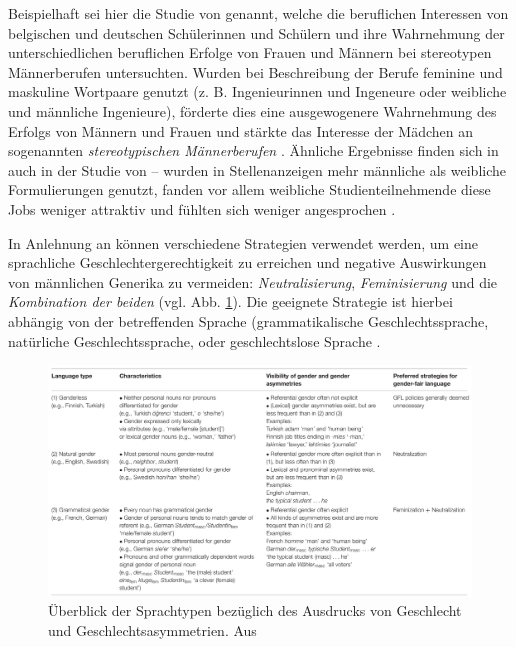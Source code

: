 \documentclass[12pt, 
    twoside=false, 
    bibliography=totoc, 
    numbers=endperiod, 
    headings=normal, 
    toc=chapterentrydotfill
    ]{scrbook}
\begin{document}
Beispielhaft sei hier die Studie von \textcite{vervecken_2013} genannt, welche die beruflichen Interessen von belgischen und deutschen Schülerinnen und Schülern und ihre Wahrnehmung der unterschiedlichen beruflichen Erfolge von Frauen und Männern bei stereotypen Männerberufen untersuchten. Wurden bei Beschreibung der Berufe feminine und maskuline Wortpaare genutzt (z. B. Ingenieurinnen und Ingeneure oder weibliche und männliche Ingenieure), förderte dies eine ausgewogenere Wahrnehmung des Erfolgs von Männern und Frauen und stärkte das Interesse der Mädchen an sogenannten \emph{stereotypischen Männerberufen} \parencite{vervecken_2013}. Ähnliche Ergebnisse finden sich in auch in der Studie von \textcite{gaucher_2011} -- wurden in Stellenanzeigen mehr männliche als weibliche Formulierungen genutzt, fanden vor allem weibliche Studienteilnehmende diese Jobs weniger attraktiv und fühlten sich weniger angesprochen \parencite[11]{gaucher_2011}.

In Anlehnung an \textcite{sczesny_2016} können verschiedene Strategien verwendet werden, um eine sprachliche Geschlechtergerechtigkeit zu erreichen und negative Auswirkungen von männlichen Generika zu vermeiden: \emph{Neutralisierung}, \emph{Feminisierung} und die \emph{Kombination der beiden} (vgl. Abb. \ref{fig:table_sprachtypen}). Die geeignete Strategie ist hierbei abhängig von der betreffenden Sprache (grammatikalische Geschlechtssprache, natürliche Geschlechtssprache, oder geschlechtslose Sprache \parencites[vgl.][]{bussmann_2003}[][3]{sczesny_2016}. 

\begin{figure}
    \centering
    \includegraphics[width=\textwidth]{images/sczesny_table.png}
    \caption[Überblick der Sprachtypen bezüglich des Ausdrucks von Geschlecht und Geschlechtsasymmetrien]{Überblick der Sprachtypen bezüglich des Ausdrucks von Geschlecht und Geschlechtsasymmetrien. Aus  \parencite{sczesny_2016}}
    \label{fig:table_sprachtypen}
\end{figure}
\end{document}
